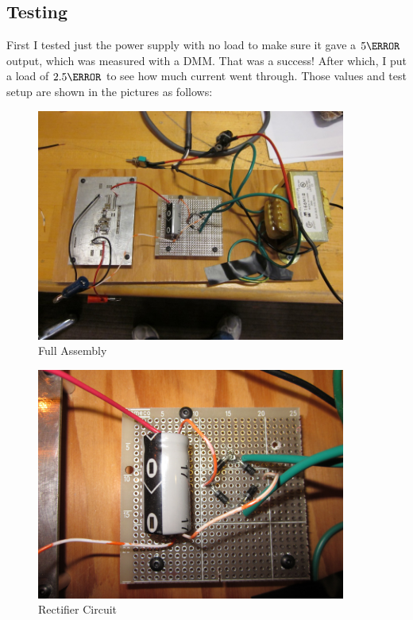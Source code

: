 \subsection{Testing}
First I tested just the power supply with no load to make sure it gave a $5\volt$ output, which was measured with a DMM. That was a success! After which, I put a load of $2.5\ohm$ to see how much current went through. Those values and test setup are shown in the pictures as follows:
\begin{figure}[htbp]
\begin{center}
\includegraphics[width=4in]{includes/IMG_0262}
\caption{Full Assembly}
\end{center}
\end{figure}

\begin{figure}[htbp]
\begin{center}
\includegraphics[width=4in]{includes/IMG_0264}
\caption{Rectifier Circuit}
\end{center}
\end{figure}

